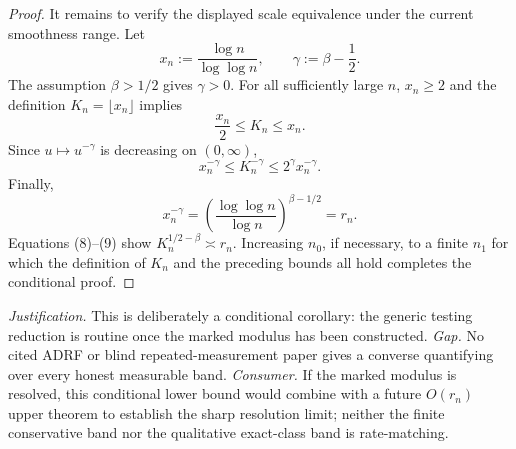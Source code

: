 \documentclass{article}
\begin{document}
\begin{proof}
It remains to verify the displayed scale equivalence under the current smoothness range.  Let
\[
x_n:=\frac{\log n}{\log\log n},
\qquad
\gamma:=\beta-\frac12.
\]
The assumption \(\beta>1/2\) gives \(\gamma>0\).  For all sufficiently large \(n\), \(x_n\ge2\) and the definition \(K_n=\lfloor x_n\rfloor\) implies
\[
\frac{x_n}{2}\le K_n\le x_n.
\]
Since \(u\mapsto u^{-\gamma}\) is decreasing on \((0,\infty)\),
\[
x_n^{-\gamma}\le K_n^{-\gamma}\le 2^\gamma x_n^{-\gamma}.
\tag{8}
\]
Finally,
\[
x_n^{-\gamma}
=\left(\frac{\log\log n}{\log n}\right)^{\beta-1/2}
=r_n.
\tag{9}
\]
Equations (8)--(9) show \(K_n^{1/2-\beta}\asymp r_n\).  Increasing \(n_0\), if necessary, to a finite \(n_1\) for which the definition of \(K_n\) and the preceding bounds all hold completes the conditional proof.
\end{proof}
\par\smallskip\noindent \textit{Justification.} This is deliberately a conditional corollary: the generic testing reduction is routine once the marked modulus has been constructed. \textit{Gap.} No cited ADRF or blind repeated-measurement paper gives a converse quantifying over every honest measurable band. \textit{Consumer.} If the marked modulus is resolved, this conditional lower bound would combine with a future \(O(r_n)\) upper theorem to establish the sharp resolution limit; neither the finite conservative band nor the qualitative exact-class band is rate-matching.
\end{document}

